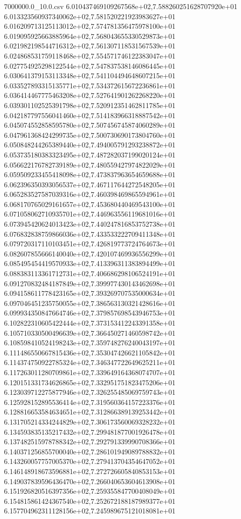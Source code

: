 \begin{filecontents*}{7000000.0_10.0.csv}
6.010437469109267568e+02,7.588260251628707920e+01
6.013323560937340062e+02,7.581520221923983627e+01
6.016209713125113012e+02,7.574781356475978100e+01
6.019095925663885964e+02,7.568043655330529873e+01
6.021982198544716312e+02,7.561307118531567539e+01
6.024868531759118468e+02,7.554571746122383047e+01
6.027754925298122544e+02,7.547837538146086445e+01
6.030641379153113348e+02,7.541104494648607215e+01
6.033527893315135771e+02,7.534372615672236861e+01
6.036414467775463208e+02,7.527641901262268220e+01
6.039301102525391798e+02,7.520912351462811785e+01
6.042187797556041460e+02,7.514183966318887542e+01
6.045074552858595780e+02,7.507456745874060289e+01
6.047961368424299735e+02,7.500730690173804760e+01
6.050848244265389440e+02,7.494005791293238872e+01
6.053735180383323495e+02,7.487282037199020124e+01
6.056622176782739189e+02,7.480559427974822029e+01
6.059509233455418098e+02,7.473837963654659688e+01
6.062396350393056537e+02,7.467117644272548205e+01
6.065283527587039316e+02,7.460398469865594961e+01
6.068170765029161657e+02,7.453680440469543100e+01
6.071058062710935701e+02,7.446963556119681016e+01
6.073945420624013423e+02,7.440247816853752738e+01
6.076832838759866036e+02,7.433533222709411348e+01
6.079720317110103451e+02,7.426819773724764673e+01
6.082607855666140040e+02,7.420107469936556299e+01
6.085495454419570933e+02,7.413396311383894499e+01
6.088383113361712731e+02,7.406686298106524191e+01
6.091270832484187849e+02,7.399977430143462698e+01
6.094158611778423165e+02,7.393269707535000634e+01
6.097046451235750055e+02,7.386563130321428616e+01
6.099934350847664746e+02,7.379857698543946753e+01
6.102822310605422444e+02,7.373153412243391358e+01
6.105710330500496639e+02,7.366450271460598742e+01
6.108598410524198243e+02,7.359748276240043197e+01
6.111486550667815436e+02,7.353047426621105842e+01
6.114374750922785324e+02,7.346347722649625211e+01
6.117263011280709861e+02,7.339649164368074707e+01
6.120151331734626865e+02,7.332951751823475206e+01
6.123039712275877946e+02,7.326255485069759743e+01
6.125928152895536414e+02,7.319560364157223376e+01
6.128816653584634651e+02,7.312866389139253442e+01
6.131705214334244829e+02,7.306173560069328232e+01
6.134593835135217432e+02,7.299481877001926478e+01
6.137482515978788342e+02,7.292791339990708366e+01
6.140371256855700040e+02,7.286101949089788832e+01
6.143260057757005370e+02,7.279413704354647052e+01
6.146148918673596881e+02,7.272726605840853153e+01
6.149037839596436470e+02,7.266040653604613908e+01
6.151926820516397356e+02,7.259355847700408049e+01
6.154815861424367540e+02,7.252672188187989377e+01
6.157704962311128156e+02,7.245989675121018081e+01

\end{filecontents*}
